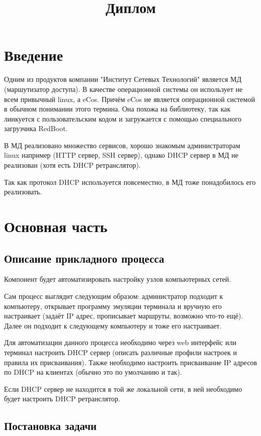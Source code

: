 \documentclass[12pt]{article}
\title{Диплом}
\begin{document}
\maketitle
\pagebreak
\section{Введение}


Одним из продуктов компании "Институт Сетевых Технологий" является МД (маршутизатор доступа). В качестве операционной системы он использует не всем привычный linux, а eCos. Причём eCos не является операционной системой в обычном понимании этого термина. Она похожа на библиотеку, так как линкуется с пользовательским кодом и загружается с помощью специального загрузчика RedBoot.

В МД реализовано множество сервисов, хорошо знакомым администраторам linux например (HTTP сервер, SSH сервер), однако DHCP сервер в МД не реализован (хотя есть DHCP ретранслятор).

Так как протокол DHCP используется повсеместно, в МД тоже понадобилось его реализовать.

\pagebreak
\section{Основная часть}

\subsection{Описание прикладного процесса}
Компонент будет автоматизировать настройку узлов компьютерных сетей.

Сам процесс выглядит следующим образом:
администратор подходит к компьютеру, открывает программу эмуляции терминала и вручную его настраивает (задаёт IP адрес, прописывает маршруты, возможно что-то ещё). Далее он подходит к следующему компьютеру и тоже его настраивает.

Для автоматизации данного процесса необходимо через web интерфейс или терминал настроить DHCP сервер (описать различные профили настроек и правила их присваивания). Также необходимо настроить присваивание IP адресов по DHCP на клиентах (обычно это по умолчанию и так).

Если DHCP сервер не находится в той же локальной сети, в ней необходимо будет настроить DHCP ретранслятор.

\subsection{Постановка задачи}
\end{document}
